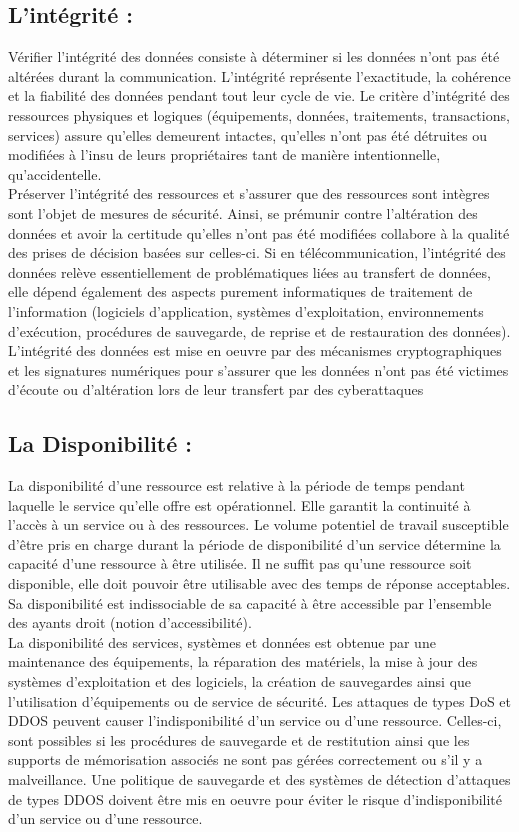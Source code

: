 \subsection{L’intégrité :}
Vérifier l’intégrité des données consiste à déterminer si les données n'ont pas été altérées durant la communication. L’intégrité représente l’exactitude, la cohérence et la fiabilité des données pendant tout leur cycle de vie. Le critère d’intégrité des ressources physiques et logiques (équipements, données, traitements, transactions, services) assure qu’elles demeurent intactes, qu’elles n’ont pas été détruites ou modifiées à l’insu de leurs propriétaires tant de manière intentionnelle, qu’accidentelle.\\

Préserver l’intégrité des ressources et s’assurer que des ressources sont intègres sont l’objet de mesures de sécurité. Ainsi, se prémunir contre l’altération des données et avoir la certitude qu’elles n’ont pas été modifiées collabore à la qualité des prises de décision basées sur celles-ci. Si en télécommunication, l’intégrité des données relève essentiellement de problématiques \cite{ref4}liées au transfert de données, elle dépend également des aspects purement informatiques de traitement de l’information (logiciels d’application, systèmes d’exploitation, environnements d’exécution, procédures de sauvegarde, de reprise et de restauration des données). L’intégrité des données est mise en oeuvre par des mécanismes cryptographiques et les signatures numériques pour s’assurer que les données n’ont pas été victimes d’écoute ou d’altération lors de leur transfert par des cyberattaques
\subsection{La Disponibilité :}
La disponibilité d’une ressource est relative à la période de temps pendant laquelle le service qu’elle offre est opérationnel. Elle garantit la continuité à l’accès à un service ou à des ressources. Le volume potentiel de travail susceptible d’être pris en charge durant la période de disponibilité d’un service détermine la capacité d’une ressource à être utilisée. Il ne suffit pas qu’une ressource soit disponible, elle doit pouvoir être utilisable avec des temps de réponse acceptables. Sa disponibilité est indissociable de sa capacité à être accessible par l’ensemble des ayants droit (notion d’accessibilité).\\

La disponibilité des services, systèmes et données est obtenue par une maintenance des équipements, la réparation des matériels, la mise à jour des systèmes d’exploitation et des logiciels, la création de sauvegardes ainsi que l’utilisation d’équipements ou de service de sécurité. Les attaques de types DoS et DDOS  peuvent causer l’indisponibilité d’un service ou d’une ressource. Celles-ci, sont possibles si les procédures de sauvegarde et de restitution ainsi que les supports de mémorisation associés ne sont pas gérées correctement ou s’il y a malveillance. Une politique de sauvegarde et des systèmes de détection d’attaques de types DDOS doivent être mis en oeuvre pour éviter le risque d’indisponibilité d’un service ou d’une ressource.
